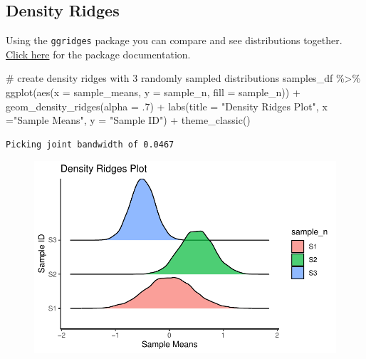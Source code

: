 \documentclass[
  letterpaper,
  DIV=11,
  numbers=noendperiod]{scrreprt}
\newenvironment{Shaded}{\begin{snugshade}}{\end{snugshade}}
\newcommand{\AttributeTok}[1]{\textcolor[rgb]{0.40,0.45,0.13}{#1}}
\newcommand{\CommentTok}[1]{\textcolor[rgb]{0.37,0.37,0.37}{#1}}
\newcommand{\DecValTok}[1]{\textcolor[rgb]{0.68,0.00,0.00}{#1}}
\newcommand{\FunctionTok}[1]{\textcolor[rgb]{0.28,0.35,0.67}{#1}}
\newcommand{\NormalTok}[1]{\textcolor[rgb]{0.00,0.23,0.31}{#1}}
\newcommand{\SpecialCharTok}[1]{\textcolor[rgb]{0.37,0.37,0.37}{#1}}
\newcommand{\StringTok}[1]{\textcolor[rgb]{0.13,0.47,0.30}{#1}}
\begin{document}
\hypertarget{density-ridges}{%
\subsection{Density Ridges}\label{density-ridges}}

Using the \texttt{ggridges} package you can compare and see
distributions together.
\href{https://rdocumentation.org/packages/ggridges/versions/0.5.3}{Click
here} for the package documentation.

\begin{Shaded}
\begin{Highlighting}[]
\CommentTok{\# create density ridges with 3 randomly sampled distributions }
\NormalTok{samples\_df }\SpecialCharTok{\%\textgreater{}\%}
  \FunctionTok{ggplot}\NormalTok{(}\FunctionTok{aes}\NormalTok{(}\AttributeTok{x =}\NormalTok{ sample\_means, }\AttributeTok{y =}\NormalTok{ sample\_n, }\AttributeTok{fill =}\NormalTok{ sample\_n)) }\SpecialCharTok{+}
  \FunctionTok{geom\_density\_ridges}\NormalTok{(}\AttributeTok{alpha =}\NormalTok{ .}\DecValTok{7}\NormalTok{) }\SpecialCharTok{+} 
  \FunctionTok{labs}\NormalTok{(}\AttributeTok{title =} \StringTok{"Density Ridges Plot"}\NormalTok{, }\AttributeTok{x =}\StringTok{"Sample Means"}\NormalTok{, }\AttributeTok{y =} \StringTok{"Sample ID"}\NormalTok{) }\SpecialCharTok{+}
  \FunctionTok{theme\_classic}\NormalTok{()}
\end{Highlighting}
\end{Shaded}

\begin{verbatim}
Picking joint bandwidth of 0.0467
\end{verbatim}

\begin{figure}[H]

{\centering \includegraphics{./visualizing-data_files/figure-pdf/unnamed-chunk-3-1.pdf}

}

\end{figure}
\end{document}
